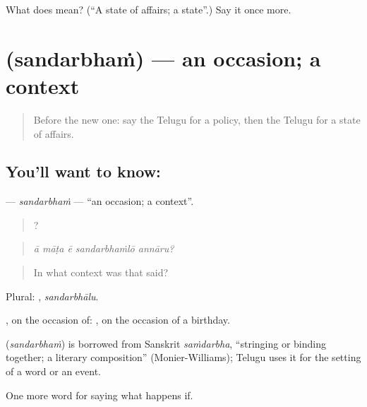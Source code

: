 \begin{tcolorbox}[breakable,colback=teal!4,colframe=teal!35!black,title={Before you move on}]
What does  mean? (\textquotedblleft{}A state of affairs; a state\textquotedblright{}.) Say it once more.
\end{tcolorbox}
\section[\texorpdfstring{\te{సందర్భం} (sandarbhaṁ)}{సందర్భం (sandarbhaṁ)}]{ (sandarbhaṁ) — an occasion; a context}

\label{lesson:TE-C434-sandarbham}



\begin{quote}
Before the new one: say the Telugu for a policy, then the Telugu for a state of affairs.
\end{quote}

\subsection*{You'll want to know: }
\textbf{} — \emph{sandarbhaṁ} — \textquotedblleft{}an occasion; a context\textquotedblright{}.

\begin{quote}
    ?
\end{quote}

\begin{quote}
\emph{ā māṭa ē sandarbhaṁlō annāru?}
\end{quote}

\begin{quote}
In what context was that said?
\end{quote}

Plural: , \emph{sandarbhālu}.

, on the occasion of:  , on the occasion of a birthday.

\begin{cousinweb}
\textbf{} (\emph{sandarbhaṁ}) is borrowed from Sanskrit \emph{saṁdarbha}, \textquotedblleft{}stringing or binding together; a literary composition\textquotedblright{} (Monier-Williams); Telugu uses it for the setting of a word or an event.
\end{cousinweb}

\begin{grammarlens}[title={What you've built}]
One more word for saying what happens if.
\end{grammarlens}

